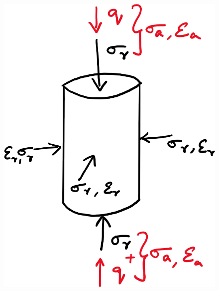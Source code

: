 \documentclass[notes]{beamer}
\begin{document}
\begin{frame}
\begin{minipage}[t]{0.35\linewidth}
\begin{figure}
		\includegraphics[width=\textwidth]{figs/triaxial.png}
	\end{figure}
\end{minipage}	
\end{frame}
\end{document}
